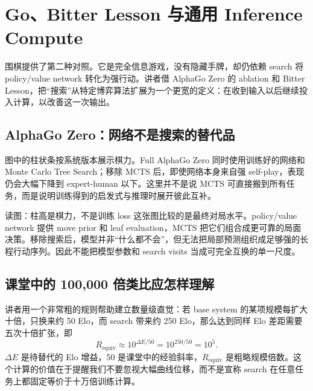 \section{Go、Bitter Lesson 与通用 Inference Compute}

围棋提供了第二种对照。它是完全信息游戏，没有隐藏手牌，却仍依赖 search 将 policy/value network 转化为强行动。讲者借 AlphaGo Zero 的 ablation 和 Bitter Lesson，把“搜索”从特定博弈算法扩展为一个更宽的定义：在收到输入以后继续投入计算，以改善这一次输出。

\subsection{AlphaGo Zero：网络不是搜索的替代品}

图中的柱状条按系统版本展示棋力。Full AlphaGo Zero 同时使用训练好的网络和 Monte Carlo Tree Search；移除 MCTS 后，即使网络本身来自强 self-play，表现仍会大幅下降到 expert-human 以下。这里并不是说 MCTS 可直接搬到所有任务，而是说明训练得到的启发式与推理时展开彼此互补。


\begin{knowledgebox}{读图：柱高是棋力，不是训练 loss}
这张图比较的是最终对局水平。policy/value network 提供 move prior 和 leaf evaluation，MCTS 把它们组合成更可靠的局面决策。移除搜索后，模型并非“什么都不会”，但无法把局部预测组织成足够强的长程行动序列。因此不能把模型参数和 search visits 当成可完全互换的单一尺度。
\end{knowledgebox}

\subsection{课堂中的 100,000 倍类比应怎样理解}

讲者用一个非常粗的规则帮助建立数量级直觉：若 base system 的某项规模每扩大十倍，只换来约 50 Elo，而 search 带来约 250 Elo，那么达到同样 Elo 差距需要五次十倍扩张，即
\begin{equation}
R_{\text{equiv}}
\approx 10^{\Delta E/50}
=10^{250/50}=10^5.
\end{equation}
$\Delta E$ 是待替代的 Elo 增益，50 是课堂中的经验斜率，$R_{\text{equiv}}$ 是粗略规模倍数。这个计算的价值在于提醒我们不要忽视大幅曲线位移，而不是宣称 search 在任意任务上都固定等价于十万倍训练计算。


